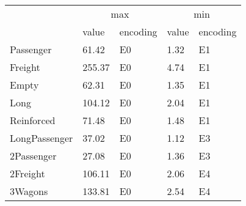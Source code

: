 \begin{tabular}{lllll}
\toprule
 & \multicolumn{2}{c}{max} & \multicolumn{2}{c}{min} \\
 & value & encoding & value & encoding \\
\midrule
Passenger & 61.42 & E0 & 1.32 & E1 \\
Freight & 255.37 & E0 & 4.74 & E1 \\
Empty & 62.31 & E0 & 1.35 & E1 \\
Long & 104.12 & E0 & 2.04 & E1 \\
Reinforced & 71.48 & E0 & 1.48 & E1 \\
LongPassenger & 37.02 & E0 & 1.12 & E3 \\
2Passenger & 27.08 & E0 & 1.36 & E3 \\
2Freight & 106.11 & E0 & 2.06 & E4 \\
3Wagons & 133.81 & E0 & 2.54 & E4 \\
\bottomrule
\end{tabular}

